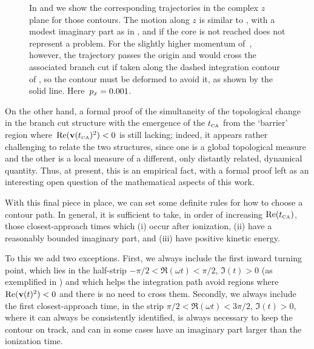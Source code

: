 \begin{figure}[p]
{%
    In \protect{} and \protect{} we show the corresponding trajectories in the complex $z$ plane for those contours. The motion along $z$ is similar to , with a modest imaginary part as in , and if the core is not reached does not represent a problem. For the slightly higher momentum of~\protect{}, however, the trajectory passes the origin and would cross the associated branch cut if taken along the dashed integration contour of \protect{}, so the contour must be deformed to avoid it, as shown by the solid line.
    Here~$p_x=0.001$.
}
\label{f5-branch-cut-topology-change}
\end{figure}


\captionsetup[figure]{position=auto}

\restoregeometry
\clearpage
\onehalfspacing










On the other hand, a formal proof of the simultaneity of the topological change in the branch cut structure with the emergence of the ${t_{\scriptscriptstyle\mathrm{CA}}}$ from the `barrier' region where~$\Re(\vb{v}({t_{\scriptscriptstyle\mathrm{CA}}})^2)<0$ is still lacking; indeed, it appears rather challenging to relate the two structures, since one is a global topological measure and the other is a local measure of a different, only distantly related, dynamical quantity. Thus, at present, this is an empirical fact, with a formal proof left as an interesting open question of the mathematical aspects of this work.



With this final piece in place, we can set some definite rules for how to choose a contour path. In general, it is sufficient to take, in order of increasing $\Re({t_{\scriptscriptstyle\mathrm{CA}}})$, those closest-approach times which (i) occur after ionization, (ii) have a reasonably bounded imaginary part, and (iii) have positive kinetic energy. 

To this we add two exceptions. First, we always include the first inward turning point, which lies in the half-strip $-\pi/2<\Re(\omega t)<\pi/2$, $\Im(t)>0$ (as exemplified in ) and which helps the integration path avoid regions where $\Re(\vb{v}(t)^2)<0$ and there is no need to cross them. Secondly, we always include the first closest-approach time, in the strip $\pi/2<\Re(\omega t)<3\pi/2$, $\Im(t)>0$, where it can always be consistently identified, is always necessary to keep the contour on track, and can in some cases have an imaginary part larger than the ionization time.

